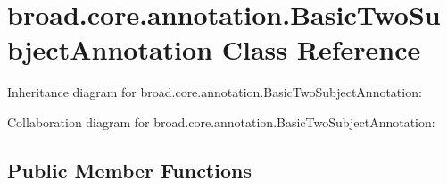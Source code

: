 \hypertarget{classbroad_1_1core_1_1annotation_1_1_basic_two_subject_annotation}{\section{broad.\+core.\+annotation.\+Basic\+Two\+Subject\+Annotation Class Reference}
\label{classbroad_1_1core_1_1annotation_1_1_basic_two_subject_annotation}
}


Inheritance diagram for broad.\+core.\+annotation.\+Basic\+Two\+Subject\+Annotation\+:


Collaboration diagram for broad.\+core.\+annotation.\+Basic\+Two\+Subject\+Annotation\+:
\subsection*{Public Member Functions}
